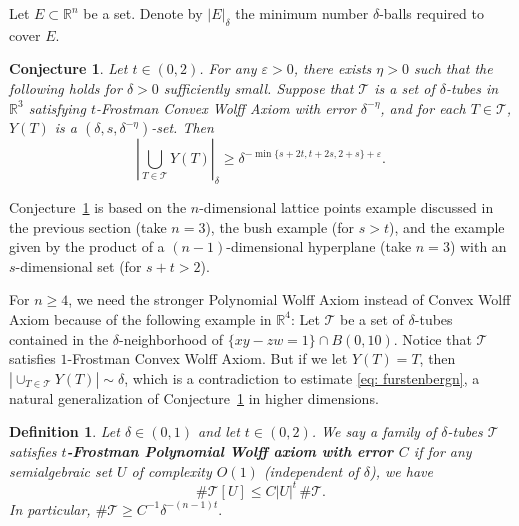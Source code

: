 \documentclass{amsart}
\numberwithin{equation}{section}
\newtheorem{definition}[theorem]{Definition}
\newtheorem{conjecture}[theorem]{Conjecture}
\newcommand{\de}{\delta}
\newcommand{\e}{\varepsilon}
\newcommand{\cT}{{\mathcal T}}
\begin{document}
\smallskip

Let $E\subset \mathbb{R}^n$ be a set. 
Denote by $|E|_{\delta}$ the minimum number $\delta$-balls required to cover $E$. 
\begin{conjecture} \label{conj: Furstenberg3}
Let $t\in (0,2)$.
For any $\e>0$, there exists $\eta>0$ such that the following holds for $\delta>0$ sufficiently small. 
Suppose that $\cT$ is a set of $\delta$-tubes in $\mathbb{R}^3$ satisfying  $t$-Frostman Convex Wolff Axiom with error $\delta^{-\eta}$, and for each $T\in \cT$, $Y(T)$ is a $(\delta, s, \delta^{-\eta})$-set.  
Then 
\begin{equation}
     |\bigcup_{T\in \cT} Y(T)|_{\delta} \geq \delta^{-\min \{ s+ 2t, t+2s, 2+s\}+\e}.
\end{equation}
\end{conjecture}

Conjecture~\ref{conj: Furstenberg3} is based on the $n$-dimensional lattice points example discussed in the previous section (take $n=3$), the bush example (for $s>t$),  and the example given by the product of a $(n-1)$-dimensional hyperplane (take $n=3$) with an $s$-dimensional set (for $s+t>2$). 


\smallskip

For $n\geq 4$, we need the stronger Polynomial Wolff Axiom instead of Convex Wolff Axiom because of the following example in $\mathbb{R}^4$: 
Let $\cT$ be a set of $\delta$-tubes contained in the $\delta$-neighborhood of  $\{ xy-zw=1 \} \cap B(0, 10)$. 
Notice that $\cT$ satisfies $1$-Frostman Convex Wolff Axiom.
But if we let $Y(T)=T$, then $|\cup_{T\in \cT} Y(T)| \sim \delta$, which is a contradiction to estimate \eqref{eq: furstenbergn}, a natural generalization of Conjecture~\ref{conj: Furstenberg3} in higher dimensions. 



\begin{definition}
Let $\de\in(0,1)$ and let $t\in (0, 2)$.
We say a family of $\de$-tubes $\cT$ satisfies { \bf $t$-Frostman Polynomial Wolff axiom with error $C$ } if for any semialgebraic set $U$ of complexity $O(1)$ (independent of $\delta$), we have 
\begin{equation}
    \#\cT[U] \leq C |U|^t  \, \#\cT. 
\end{equation}
In particular, $\# \cT\geq C^{-1} \delta^{-(n-1)t}.$
\end{definition}



\end{document}
